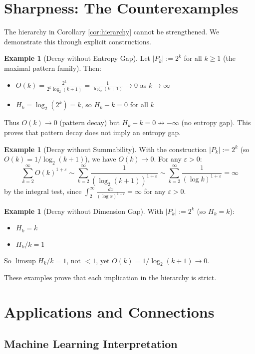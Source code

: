 \documentclass[11pt]{article}
\theoremstyle{definition}
\newtheorem{example}[theorem]{Example}
\newcommand{\eps}{\varepsilon}
\begin{document}
\section{Sharpness: The Counterexamples}

The hierarchy in Corollary \ref{cor:hierarchy} cannot be strengthened. We demonstrate this through explicit constructions.

\begin{example}[Decay without Entropy Gap]\label{ex:no-gap}
Let $|P_k| := 2^k$ for all $k \geq 1$ (the maximal pattern family). Then:
\begin{itemize}
\item $O(k) = \frac{2^k}{2^k \log_2(k+1)} = \frac{1}{\log_2(k+1)} \to 0$ as $k \to \infty$
\item $H_k = \log_2(2^k) = k$, so $H_k - k = 0$ for all $k$
\end{itemize}
Thus $O(k) \to 0$ (pattern decay) but $H_k - k = 0 \not\to -\infty$ (no entropy gap). This proves that pattern decay does not imply an entropy gap.
\end{example}

\begin{example}[Decay without Summability]
With the construction $|P_k|:=2^k$ (so $O(k) = 1/\log_2(k+1)$), we have $O(k) \to 0$. For any $\eps>0$:
$$\sum_{k=2}^{\infty} O(k)^{1+\eps} \sim \sum_{k=2}^{\infty} \frac{1}{(\log_2(k+1))^{1+\eps}} \sim \sum_{k=2}^{\infty} \frac{1}{(\log k)^{1+\eps}}=\infty$$
by the integral test, since $\int_2^\infty \frac{dx}{(\log x)^{1+\eps}} = \infty$ for any $\eps > 0$.
\end{example}

\begin{example}[Decay without Dimension Gap]
With $|P_k|:=2^k$ (so $H_k = k$):
\begin{itemize}
\item $H_k = k$
\item $H_k/k = 1$
\end{itemize}
So $\limsup H_k/k=1$, not $<1$, yet $O(k) = 1/\log_2(k+1) \to 0$.
\end{example}

These examples prove that each implication in the hierarchy is strict.

\section{Applications and Connections}

\subsection{Machine Learning Interpretation}
\end{document}
